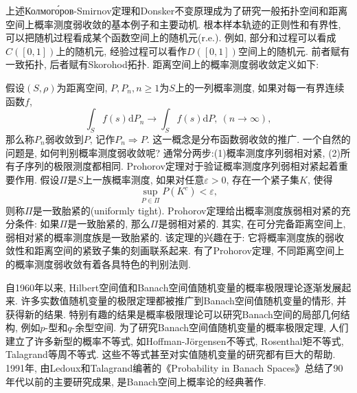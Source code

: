 上述Колмого́ров-Smirnov定理和Donsker不变原理成为了研究一般拓扑空间和距离空间上概率测度弱收敛的基本例子和主要动机. 根本样本轨迹的正则性和有界性, 可以把随机过程看成某个函数空间上的随机元(r.e.). 例如, 部分和过程可以看成$C([0,1])$上的随机元, 经验过程可以看作$D([0,1])$空间上的随机元. 前者赋有一致拓扑, 后者赋有Skorohod拓扑. 距离空间上的概率测度弱收敛定义如下:

假设$(S,\rho)$为距离空间, $P,P_n, n\geqslant 1$为$S$上的一列概率测度, 如果对每一有界连续函数$f$,
\begin{equation}
\int_Sf(s)\mathrm{d}P_n\to\int_Sf(s)\mathrm{d}P,~(n\to\infty),
\end{equation}
那么称$P_n$弱收敛到$P$, 记作$P_n\Rightarrow P$. 这一概念是分布函数弱收敛的推广. 一个自然的问题是, 如何判别概率测度弱收敛呢? 通常分两步:(1)概率测度序列弱相对紧, (2)所有子序列的极限测度都相同. Prohorov定理对于验证概率测度序列弱相对紧起着重要作用. 假设$\Pi$是$S$上一族概率测度, 如果对任意$\varepsilon>0$, 存在一个紧子集$K$, 使得\begin{equation}
\sup_{P\in\Pi}P(K^c)<\varepsilon,
\end{equation}
则称$\Pi$是一致胎紧的(uniformly tight). Prohorov定理给出概率测度族弱相对紧的充分条件: 如果$\Pi$是一致胎紧的, 那么$\Pi$是弱相对紧的. 其实, 在可分完备距离空间上, 弱相对紧的概率测度族是一致胎紧的. 该定理的兴趣在于: 它将概率测度族的弱收敛性和距离空间的紧致子集的刻画联系起来. 有了Prohorov定理, 不同距离空间上的概率测度弱收敛有着各具特色的判别法则.

自1960年以来, Hilbert空间值和Banach空间值随机变量的概率极限理论逐渐发展起来. 许多实数值随机变量的极限定理都被推广到Banach空间值随机变量的情形, 并获得新的结果. 特别有趣的结果是概率极限理论可以研究Banach空间的局部几何结构, 例如$p$-型和$q$-余型空间. 为了研究Banach空间值随机变量的概率极限定理, 人们建立了许多新型的概率不等式, 如Hoffman-Jörgensen不等式, Rosenthal矩不等式, Talagrand等周不等式. 这些不等式甚至对实值随机变量的研究都有巨大的帮助. 1991年, 由Ledoux和Talagrand编著的《Probability in Banach Spaces》总结了90年代以前的主要研究成果, 是Banach空间上概率论的经典著作.

